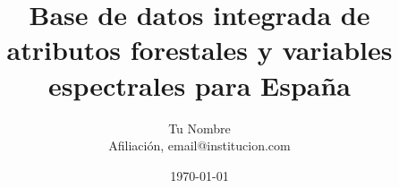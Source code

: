 \documentclass[11pt,a4paper]{article}
\title{Base de datos integrada de atributos forestales y variables espectrales para España}
\author{Tu Nombre \\ \small{Afiliación, email@institucion.com}}
\date{\today}
\begin{document}
\maketitle

\begin{abstract}

\end{abstract}




\newpage


\newpage


\newpage


\newpage


\newpage


\newpage


\newpage


\newpage


% 
\printbibliography
\end{document}
